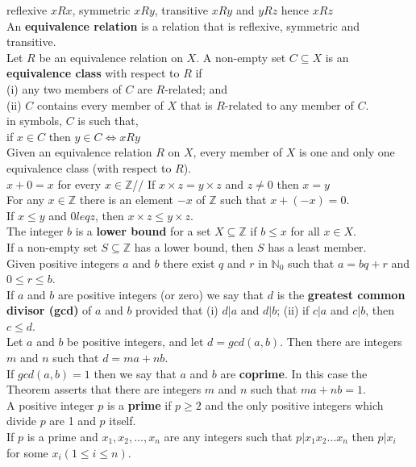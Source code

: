 \documentclass[10pt,landscape]{article}
\begin{document}
\begin{multicols}{3}
reflexive $xRx$, symmetric $xRy$, transitive $xRy$ and $yRz$ hence $xRz$\\
An \textbf{equivalence relation} is a relation that is reflexive, symmetric and transitive.\\
Let $R$ be an equivalence relation on $X$. A non-empty set $C \subseteq X$ is an \textbf{equivalence class} with respect to $R$ if\\
(i) any two members of $C$ are $R$-related; and\\
(ii) $C$ contains every member of $X$ that is $R$-related to any member of $C$.\\
in symbols, $C$ is such that,\\
if $x \in C$ then $y \in C \iff xRy$\\ 
Given an equivalence relation $R$ on $X$, every member of $X$ is one and only one equivalence class (with respect to $R$).\\
$x + 0 = x$ for every $x \in \mathbb{Z}$//
If $x \times z = y \times z$ and $z \neq 0$ then $x = y$\\
For any $x \in \mathbb{Z}$ there is an element $-x$ of $\mathbb{Z}$ such that $x +(-x)=0$.\\
If $x \leq y$ and $0 leq z$, then $x \times z \leq y \times z$.\\
The integer $b$ is a \textbf{lower bound} for a set $X \subseteq \mathbb{Z}$ if $b \leq x$ for all $x \in X$.\\
If a non-empty set $S \subseteq \mathbb{Z}$ has a lower bound, then $S$ has a least member.\\
Given positive integers $a$ and $b$ there exist $q$ and $r$ in $\mathbb{N}_0$ such that $a = bq + r$ and $0 \leq r \leq b$. \\
If $a$ and $b$ are positive integers (or zero) we say that $d$ is the \textbf{greatest common divisor (gcd)} of $a$ and $b$ provided that (i) $d|a$ and $d|b$; (ii) if $c|a$ and $c|b$, then $c \leq d$.\\
Let $a$ and $b$ be positive integers, and let $d = gcd(a,b)$. Then there are integers $m$ and $n$ such that $d = ma + nb$.\\
If $gcd(a,b) = 1$ then we say that $a$ and $b$ are \textbf{coprime}. In this case the Theorem asserts that there are integers $m$ and $n$ such that $ma + nb = 1$.\\
A positive integer $p$ is a \textbf{prime} if $p \geq 2$ and the only positive integers which divide $p$ are 1 and $p$ itself.\\
If $p$ is a prime and $x_1, x_2, \dotsc ,x_n$ are any integers such that $p|x_1 x_2 \dots x_n$ then $p|x_i$ for some $x_i(1 \leq i \leq n)$.\\

\end{multicols}
\end{document}
